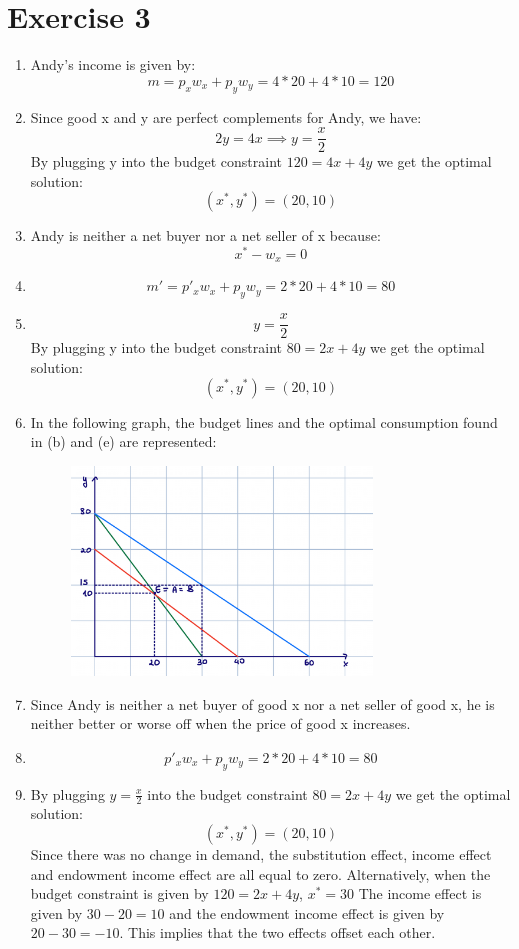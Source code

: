\documentclass{article}
\begin{document}
\section*{Exercise 3}
\begin{enumerate}[label=(\alph*)]
\item Andy’s income is given by:
\[m=p_xw_x+p_yw_y=4*20+4*10=120\]
\item Since good x and y are perfect complements for Andy, we have:
\[2y=4x \implies y= \frac{x}{2} \]
By plugging y into the budget constraint $120=4x+4y$ we get the optimal solution:
\[ (x^*, y^*)=(20,10)\]
\item Andy is neither a net buyer nor a net seller of x because:
\[x^*-w_x=0\]
\item \[m'=p'_xw_x+p_yw_y=2*20+4*10=80\]
\item \[ y =\frac{x}{2} \]
By plugging y into the budget constraint $80=2x+4y$ we get the optimal solution:
\[ (x^*, y^*)=(20,10)\]
\item In the following graph, the budget lines and the optimal consumption found in (b) and (e) are represented:

\begin{figure}[H]
    \centering
    \includegraphics[width=8cm]{fig3.png}
    \caption{}
    \label{fig:galaxy}
\end{figure}
\item Since Andy is neither a net buyer of good x nor a net seller of good x, he is neither better or worse off when the price of good x increases. 
\item \[ p'_xw_x+p_yw_y=2*20+4*10=80\]
\item By plugging $y=\frac{x}{2}$ into the budget constraint $80=2x+4y$ we get the optimal solution:
\[ (x^*, y^*)=(20,10)\]
Since there was no change in demand, the substitution effect, income effect and endowment income effect are all equal to zero. Alternatively, when the budget constraint is given by $120=2x+4y$, $x^*=30$
The income effect is given by $30-20=10$ and the endowment income effect is given by $20-30=-10$. This implies that the two effects offset each other.  
\end{enumerate}
\end{document}
